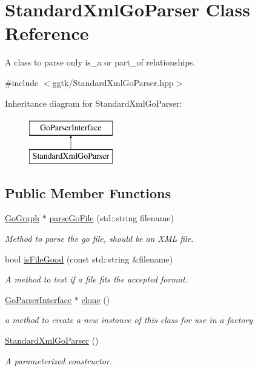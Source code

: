 \hypertarget{classStandardXmlGoParser}{}\section{Standard\+Xml\+Go\+Parser Class Reference}
\label{classStandardXmlGoParser}


A class to parse only is\+\_\+a or part\+\_\+of relationships.  




{\ttfamily \#include $<$ggtk/\+Standard\+Xml\+Go\+Parser.\+hpp$>$}

Inheritance diagram for Standard\+Xml\+Go\+Parser\+:\begin{figure}[H]
\begin{center}
\leavevmode
\includegraphics[height=2.000000cm]{classStandardXmlGoParser}
\end{center}
\end{figure}
\subsection*{Public Member Functions}
\begin{DoxyCompactItemize}
\item 
\hyperlink{classGoGraph}{Go\+Graph} $\ast$ \hyperlink{classStandardXmlGoParser_ae56413ab11d1fa8f3870f5bcc262d3f8}{parse\+Go\+File} (std\+::string filename)
\begin{DoxyCompactList}\small\item\em Method to parse the go file, should be an X\+ML file. \end{DoxyCompactList}\item 
bool \hyperlink{classStandardXmlGoParser_a74c344440ef2ce5b30536e09691c92ab}{is\+File\+Good} (const std\+::string \&filename)
\begin{DoxyCompactList}\small\item\em A method to test if a file fits the accepted format. \end{DoxyCompactList}\item 
\hyperlink{classGoParserInterface}{Go\+Parser\+Interface} $\ast$ \hyperlink{classStandardXmlGoParser_ac05cc1de0c2fc74e089169f9baea1f0d}{clone} ()
\begin{DoxyCompactList}\small\item\em a method to create a new instance of this class for use in a factory \end{DoxyCompactList}\item 
\hyperlink{classStandardXmlGoParser_aedda17aae5f75704829b279d2bfe7ac7}{Standard\+Xml\+Go\+Parser} ()
\begin{DoxyCompactList}\small\item\em A parameterized constructor. \end{DoxyCompactList}\end{DoxyCompactItemize}


